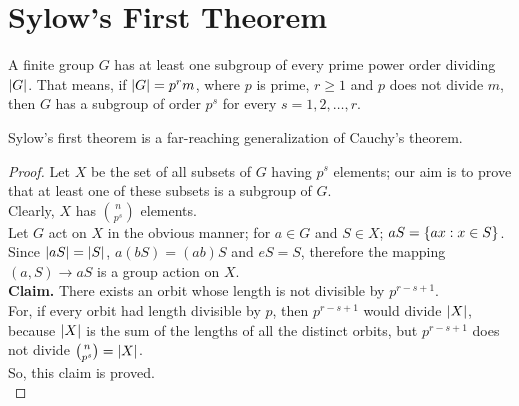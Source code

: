 \documentclass[../main-sheet.tex]{subfiles}
\begin{document}
    \section{Sylow's First Theorem}
    \begin{thm}
        A finite group \(G\) has at least one subgroup of every prime power order
        dividing \(\left\vert G\right\vert\). That means, if \(\left\vert G\right\vert = p^rm\), where \(p\) is prime, \(r\geq 1\) and \(p\) does not divide \(m\), then \(G\) has a subgroup of order \(p^s\) for every \(s=1,2,\dots,r\).
    \end{thm}
    \begin{note}
        Sylow's first theorem is a far-reaching generalization of Cauchy's theorem.
    \end{note}
    \begin{proof}
        Let \(X\) be the set of all subsets of \(G\) having \(p^s\) elements; our aim is to prove that at
        least one of these subsets is a subgroup of \(G\).\\
        Clearly, \(X\) has \(\binom{n}{p^s}\) elements.\\
        Let \(G\) act on \(X\) in the obvious manner; for \(a \in G\) and \(S \in X \); \(aS = \left\{ax: x \in S\right\}\).\\
        Since \(\left\vert aS\right\vert=\left\vert S\right\vert\), \(a( bS ) = ( ab )S\) and \(eS = S\),
        therefore the mapping \((a, S) \to aS\) is a group action on \(X\).\\
        \textbf{Claim.} There exists an orbit whose length is not divisible by \(p^{r-s+1}\).\\
        For, if every orbit had length divisible by \(p\), then \(p^{r-s+1}\) would divide \(\left\vert X\right\vert\),
        because \(\left\vert X\right\vert\) is the sum of the lengths of all the distinct orbits,
        but \(p^{r-s+1}\) does not divide \(\binom{n}{p^s}=\left\vert X\right\vert\).\\
        So, this claim is proved.\\



\end{proof}
\end{document}

